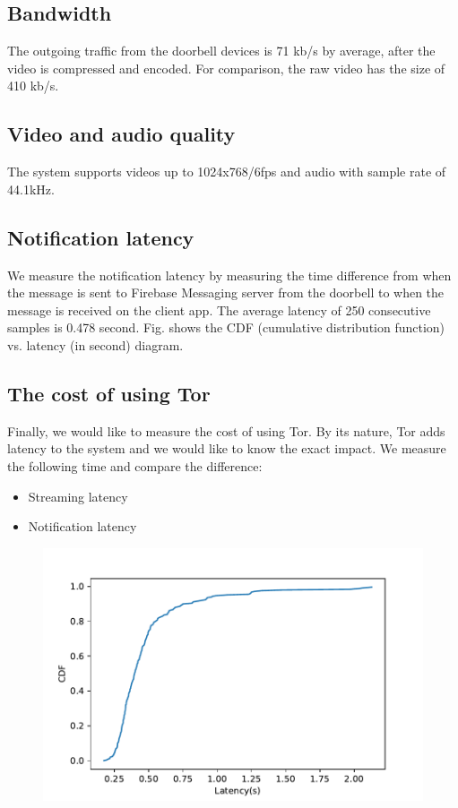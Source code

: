 \subsection{Bandwidth}
The outgoing traffic from the doorbell devices is 71 kb/s by average, after the video is compressed and encoded. For comparison, the raw video has the size of 410 kb/s.

\subsection{Video and audio quality}
The system supports videos up to 1024x768/6fps and audio with sample rate of 44.1kHz.

\subsection{Notification latency}
\label{subsec:notification_latency}
We measure the notification latency by measuring the time difference from when the message is sent to Firebase Messaging server from the doorbell to when the message is received on the client app. The average latency of 250 consecutive samples is 0.478 second. Fig. \cite{fig:notificationlatency_wTor} shows the CDF (cumulative distribution function) vs. latency (in second) diagram.

\subsection{The cost of using Tor}
Finally, we would like to measure the cost of using Tor. By its nature, Tor adds latency to the system and we would like to know the exact impact. We measure the following time and compare the difference:

\begin{itemize}
	\item Streaming latency
	\item Notification latency
\end{itemize}

\begin{figure}
	\includegraphics[width=\linewidth]{notification_latency_withTor.pdf}
	\caption{}
	\label{fig:notificationlatency_wTor}
\end{figure}

